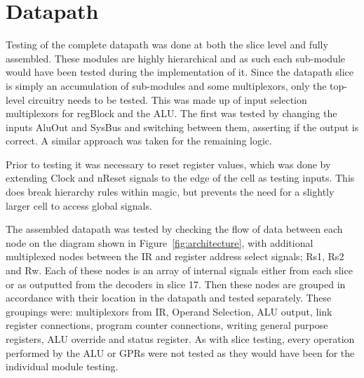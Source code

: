 
\section{Datapath}

Testing of the complete datapath was done at both the slice level and fully assembled. These modules are highly hierarchical and as such each sub-module would have been tested during the implementation of it. Since the datapath slice is simply an accumulation of sub-modules and some multiplexors, only the top-level circuitry needs to be tested. This was made up of input selection multiplexors for regBlock and the ALU. The first was tested by changing the inputs AluOut and SysBus and switching between them, asserting if the output is correct. A similar approach was taken for the remaining logic.

Prior to testing it was necessary to reset register values, which was done by extending Clock and nReset signals to the edge of the cell as testing inputs. This does break hierarchy rules within magic, but prevents the need for a slightly larger cell to access global signals. 

The assembled datapath was tested by checking the flow of data between each node on the diagram shown in Figure~\ref{fig:architecture}, with additional multiplexed nodes between the IR and register address select signals; Rs1, Rs2 and Rw. Each of these nodes is an array of internal signals either from each slice or as outputted from the decoders in slice 17. Then these nodes are grouped in accordance with their location in the datapath and tested separately. These groupings were: multiplexors from IR, Operand Selection, ALU output, link register connections, program counter connections, writing general purpose registers, ALU override and status register. As with slice testing, every operation performed by the ALU or GPRs were not tested as they would have been for the individual module testing. 